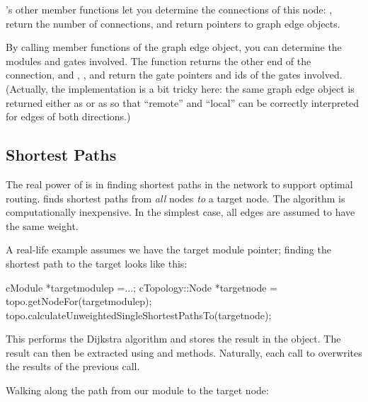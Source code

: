's other member functions let you determine the
connections of this node: ,  return
the number of connections,  and
 return pointers to graph edge objects.

By calling member functions of the graph edge object, you can
determine the modules and gates involved. The 
function returns the other end of the connection, and
, ,  and
 return the gate pointers and ids of the gates
involved. (Actually, the implementation is a bit tricky here: the same
graph edge object  is returned either as
 or as  so that ``remote''
and ``local'' can be correctly interpreted for edges of both
directions.)


\subsection{Shortest Paths}
\label{sec:sim-lib:ctopology-shortest-paths}

The real power of  is in finding shortest
paths in the network to support optimal
routing.  finds shortest paths
from \textit{all} nodes \textit{to} a target node. The algorithm is
computationally inexpensive. In the simplest case, all edges are
assumed to have the same weight.

A real-life example assumes we have the target module pointer; finding
the shortest path to the target looks like this:

\begin{cpp}
cModule *targetmodulep =...;
cTopology::Node *targetnode = topo.getNodeFor(targetmodulep);
topo.calculateUnweightedSingleShortestPathsTo(targetnode);
\end{cpp}


This performs the Dijkstra algorithm and
stores the result in the  object. The result can
then be extracted using  and
 methods.  Naturally, each call to
 overwrites the results of
the previous call.

Walking along the path from our module to the target node:

